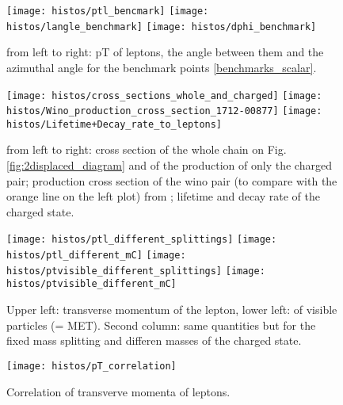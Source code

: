 \documentclass[10pt,letterpaper,notitlepage]{article}
\begin{document}
\begin{figure}[H]
\centering

\texttt{[image: histos/ptl\_bencmark]}
\texttt{[image: histos/langle\_benchmark]}
\texttt{[image: histos/dphi\_benchmark]}

\caption{\label{fig:benchmark}from left to right: pT of leptons, the angle between them and the azimuthal angle for the benchmark points \ref{benchmarks_scalar}. }
\end{figure}

\begin{figure}[h!]
\centering

\texttt{[image: histos/cross\_sections\_whole\_and\_charged]}
\texttt{[image: histos/Wino\_production\_cross\_section\_1712-00877]}
\texttt{[image: histos/Lifetime+Decay\_rate\_to\_leptons]}

\caption{\label{fig:cross-lifetime}from left to right: cross section of the whole chain on Fig.\ref{fig:2displaced_diagram} and of the production of only the charged pair; production cross section of the wino pair (to compare with the orange line on the left plot) from \cite{Santoni:2017lcl}; lifetime and decay rate of the charged state. }
\end{figure}




\begin{figure}[H]
\centering

\texttt{[image: histos/ptl\_different\_splittings]}
\texttt{[image: histos/ptl\_different\_mC]}
\texttt{[image: histos/ptvisible\_different\_splittings]}
\texttt{[image: histos/ptvisible\_different\_mC]}

\caption{\label{fig:pT-MET}Upper left: transverse momentum of the lepton, lower left: of visible particles (= MET). Second column: same quantities but for the fixed mass splitting and differen masses of the charged state.}
\end{figure}

\begin{figure}[H]
\centering

\texttt{[image: histos/pT\_correlation]}

\caption{\label{fig:pT-corr}Correlation of transverve momenta of leptons.}
\end{figure}
\end{document}
